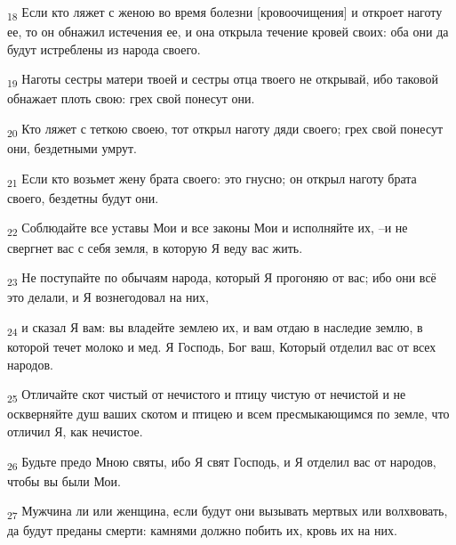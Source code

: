 \begin{tcolorbox}
\textsubscript{18} Если кто ляжет с женою во время болезни [кровоочищения] и откроет наготу ее, то он обнажил истечения ее, и она открыла течение кровей своих: оба они да будут истреблены из народа своего.
\end{tcolorbox}
\begin{tcolorbox}
\textsubscript{19} Наготы сестры матери твоей и сестры отца твоего не открывай, ибо таковой обнажает плоть свою: грех свой понесут они.
\end{tcolorbox}
\begin{tcolorbox}
\textsubscript{20} Кто ляжет с теткою своею, тот открыл наготу дяди своего; грех свой понесут они, бездетными умрут.
\end{tcolorbox}
\begin{tcolorbox}
\textsubscript{21} Если кто возьмет жену брата своего: это гнусно; он открыл наготу брата своего, бездетны будут они.
\end{tcolorbox}
\begin{tcolorbox}
\textsubscript{22} Соблюдайте все уставы Мои и все законы Мои и исполняйте их, --и не свергнет вас с себя земля, в которую Я веду вас жить.
\end{tcolorbox}
\begin{tcolorbox}
\textsubscript{23} Не поступайте по обычаям народа, который Я прогоняю от вас; ибо они всё это делали, и Я вознегодовал на них,
\end{tcolorbox}
\begin{tcolorbox}
\textsubscript{24} и сказал Я вам: вы владейте землею их, и вам отдаю в наследие землю, в которой течет молоко и мед. Я Господь, Бог ваш, Который отделил вас от всех народов.
\end{tcolorbox}
\begin{tcolorbox}
\textsubscript{25} Отличайте скот чистый от нечистого и птицу чистую от нечистой и не оскверняйте душ ваших скотом и птицею и всем пресмыкающимся по земле, что отличил Я, как нечистое.
\end{tcolorbox}
\begin{tcolorbox}
\textsubscript{26} Будьте предо Мною святы, ибо Я свят Господь, и Я отделил вас от народов, чтобы вы были Мои.
\end{tcolorbox}
\begin{tcolorbox}
\textsubscript{27} Мужчина ли или женщина, если будут они вызывать мертвых или волхвовать, да будут преданы смерти: камнями должно побить их, кровь их на них.
\end{tcolorbox}
